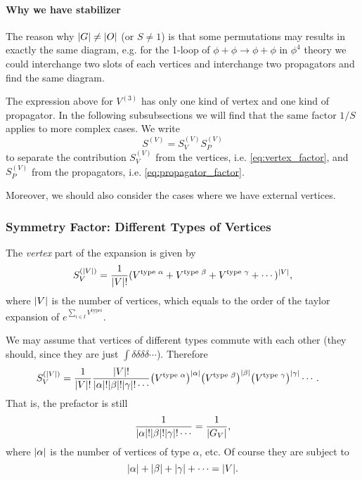 \documentclass{article}
\begin{document}
\paragraph*{Why we have stabilizer}
The reason why $\abs{G} \neq \abs{O}$ (or $S\neq 1$) is that some permutations may results in exactly the same diagram, e.g. for the 1-loop of $\phi+\phi\rightarrow\phi+\phi$ in $\phi^4$ theory we could interchange two slots of each vertices and interchange two propagators and find the same diagram.

\par
The expression above for $V^{(3)}$ has only one kind of vertex and one kind of propagator.
In the following subsubsections we will find that the same factor $1/S$ applies to more complex cases.
We write
\[ S^{(V)} = S^{(V)}_{V} S^{(V)}_{P} \]
to separate the contribution $S^{(V)}_V$ from the vertices, i.e. \eqref{eq:vertex_factor}, and $S^{(V)}_P$ from the propagators, i.e. \eqref{eq:propagator_factor}.
\par
Moreover, we should also consider the cases where we have external vertices.

\subsubsection{Symmetry Factor: Different Types of Vertices}

The \textit{vertex} part of the expansion is given by
\[ S^{(\abs{V})}_V = \frac{1}{\abs{V}!} (V^{\text{type }\alpha} + V^{\text{type }\beta} + V^{\text{type }\gamma} + \cdots)^{\abs{V}}, \]
where $\abs{V}$ is the number of vertices, which equals to the order of the taylor expansion of $e^{\sum_{i\in I} V^{\text{type} i} }$.
\par
We may assume that vertices of different types commute with each other (they should, since they are just $\int \delta\delta\delta\delta\cdots$).
Therefore
\begin{align*}
    & S^{(\abs{V})}_V = \frac{1}{\abs{V}!} \frac{\abs{V}!}{\abs{\alpha}! \abs{\beta}! \abs{\gamma}! \cdots} \qty(V^{\text{type }\alpha})^{\abs{\alpha}}\qty(V^{\text{type }\beta})^{\abs{\beta}}\qty(V^{\text{type }\gamma})^{\abs{\gamma}}\cdots.
\end{align*}
That is, the prefactor is still
\[ \frac{1}{\abs{\alpha}! \abs{\beta}! \abs{\gamma}! \cdots} = \frac{1}{\abs{G_V}}, \]
where $\abs{\alpha}$ is the number of vertices of type $\alpha$, etc.
Of course they are subject to
\[ \abs{\alpha} + \abs{\beta} + \abs{\gamma} + \cdots = \abs{V}. \]
\end{document}
